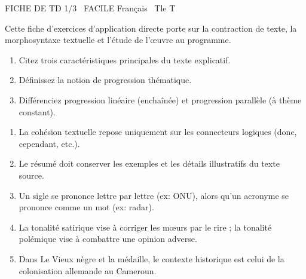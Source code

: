 \documentclass[11pt]{article}
\begin{document}
\begin{tcolorbox}[enhanced,colback=popink,colframe=popink,arc=10pt,boxrule=0pt,left=12pt,right=12pt,top=9pt,bottom=9pt]
{\color{white}\popxbold\small FICHE DE TD 1/3 \textbullet\ FACILE \hfill Français \textbullet\ Tle T\par}
\end{tcolorbox}
\vspace{4pt}
Cette fiche d'exercices d'application directe porte sur la contraction de texte, la morphosyntaxe textuelle et l'étude de l'œuvre au programme.

\begin{exercice}
\begin{enumerate}
    \item Citez trois caractéristiques principales du texte explicatif.
    \item Définissez la notion de progression thématique.
    \item Différenciez progression linéaire (enchaînée) et progression parallèle (à thème constant).
\end{enumerate}
\end{exercice}

\begin{exercice}
\begin{enumerate}
    \item La cohésion textuelle repose uniquement sur les connecteurs logiques (donc, cependant, etc.).
    \item Le résumé doit conserver les exemples et les détails illustratifs du texte source.
    \item Un sigle se prononce lettre par lettre (ex: ONU), alors qu'un acronyme se prononce comme un mot (ex: radar).
    \item La tonalité satirique vise à corriger les mœurs par le rire ; la tonalité polémique vise à combattre une opinion adverse.
    \item Dans \og Le Vieux nègre et la médaille\fg{}, le contexte historique est celui de la colonisation allemande au Cameroun.
\end{enumerate}
\end{exercice}
\end{document}
